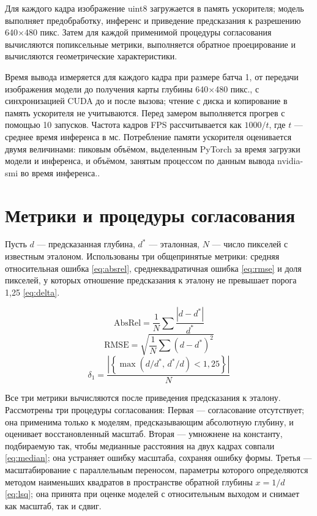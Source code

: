 \documentclass{misisarticle}
\begin{document}
Для каждого кадра изображение uint8 загружается в память ускорителя; модель выполняет предобработку, инференс и приведение предсказания к разрешению 640$\times$480 пикс. Затем для каждой применимой процедуры согласования вычисляются попиксельные метрики, выполняется обратное проецирование и вычисляются геометрические характеристики.

Время вывода измеряется для каждого кадра при размере батча 1, от передачи изображения модели до получения карты глубины 640$\times$480 пикс., с синхронизацией CUDA до и после вызова; чтение с диска и копирование в память ускорителя не учитываются. Перед замером выполняется прогрев с помощью 10 запусков. Частота кадров FPS рассчитывается как $1000/t$, где $t$ --- среднее время инференса в мс. Потребление памяти ускорителя оценивается двумя величинами: пиковым объёмом, выделенным PyTorch за время загрузки модели и инференса, и объёмом, занятым процессом по данным вывода nvidia-smi во время инференса..

\section{Метрики и процедуры согласования}

Пусть $d$ --- предсказанная глубина, $d^*$ --- эталонная, $N$ --- число пикселей с известным эталоном. Использованы три общепринятые метрики: средняя относительная ошибка \eqref{eq:absrel}, среднеквадратичная ошибка \eqref{eq:rmse} и доля пикселей, у которых отношение предсказания к эталону не превышает порога 1,25 \eqref{eq:delta}.

\begin{equation}
  \mathrm{AbsRel} = \frac{1}{N}\sum \frac{|d - d^*|}{d^*}
  \label{eq:absrel}
\end{equation}
\begin{equation}
  \mathrm{RMSE} = \sqrt{\frac{1}{N}\sum (d - d^*)^2}
  \label{eq:rmse}
\end{equation}
\begin{equation}
  \delta_1 = \frac{\left|\left\{\max(d/d^*,\, d^*/d) < 1{,}25\right\}\right|}{N}
  \label{eq:delta}
\end{equation}

Все три метрики вычисляются после приведения предсказания к эталону. Рассмотрены три процедуры согласования: Первая --- согласование отсутствует; она применима только к моделям, предсказывающим абсолютную глубину, и оценивает восстановленный масштаб. Вторая --- умножнене на константу, подбираемую так, чтобы медианные расстояния на двух кадрах совпали \eqref{eq:median}; она устраняет ошибку масштаба, сохраняя ошибку формы. Третья --- масштабирование с параллельным переносом, параметры которого определяются методом наименьших квадратов в пространстве обратной глубины $x = 1/d$ \eqref{eq:lsq}; она принята при оценке моделей с относительным выходом и снимает как масштаб, так и сдвиг.
\end{document}
